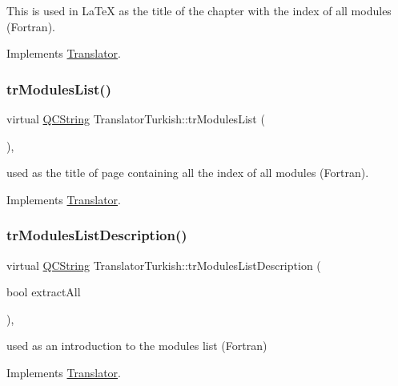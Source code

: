 This is used in La\+TeX as the title of the chapter with the index of all modules (Fortran). 

Implements \mbox{\hyperlink{class_translator}{Translator}}.

\mbox{\label{class_translator_turkish_a33fa7f2c33f672e54728ec7b6b059f15}} 
\subsubsection{\texorpdfstring{trModulesList()}{trModulesList()}}
{\footnotesize\ttfamily virtual \mbox{\hyperlink{class_q_c_string}{Q\+C\+String}} Translator\+Turkish\+::tr\+Modules\+List (\begin{DoxyParamCaption}{ }\end{DoxyParamCaption})\hspace{0.3cm}{\ttfamily [inline]}, {\ttfamily [virtual]}}

used as the title of page containing all the index of all modules (Fortran). 

Implements \mbox{\hyperlink{class_translator}{Translator}}.

\mbox{\label{class_translator_turkish_aae0bc6d38501ab69d8311c1052ccaea5}} 
\subsubsection{\texorpdfstring{trModulesListDescription()}{trModulesListDescription()}}
{\footnotesize\ttfamily virtual \mbox{\hyperlink{class_q_c_string}{Q\+C\+String}} Translator\+Turkish\+::tr\+Modules\+List\+Description (\begin{DoxyParamCaption}\item[{bool}]{extract\+All }\end{DoxyParamCaption})\hspace{0.3cm}{\ttfamily [inline]}, {\ttfamily [virtual]}}

used as an introduction to the modules list (Fortran) 

Implements \mbox{\hyperlink{class_translator}{Translator}}.

